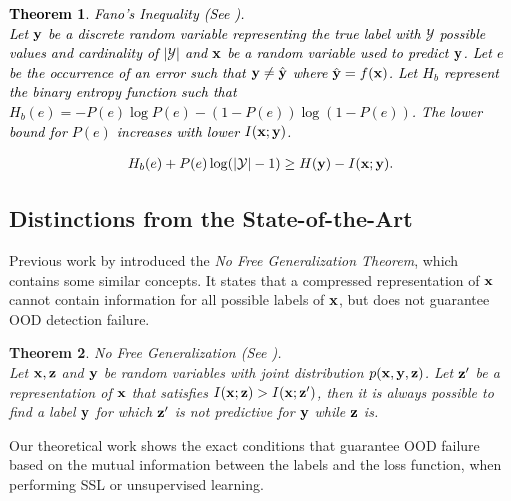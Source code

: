 \documentclass{article} %
\theoremstyle{plain}
\newtheorem{theorem}{Theorem}[section]
\theoremstyle{definition}
\theoremstyle{remark}
\begin{document}
\textcolor{black}{
\begin{theorem}
Fano's Inequality (See \citep{robert1952fano}). \\Let ${\mathbf{y}}$ be a discrete random variable representing the true label with $\mathcal{Y} $ possible values and cardinality of $|\mathcal{Y}| $ and ${\mathbf{x}}$ be a random variable used to predict ${\mathbf{y}}$. Let $e$ be the occurrence of an error such that ${\mathbf{y}} \neq \hat{ {\mathbf{y}}}$ where $\hat{ {\mathbf{y}}} = f({\mathbf{x}})$. Let $H_b$ represent the binary entropy function such that $H_b(e)=-P(e) \log P(e)-(1-P(e)) \log (1-P(e))$. The lower bound for $P(e)$ increases with lower $I({\mathbf{x}};{\mathbf{y}})$. 
\label{fano}
\end{theorem}}

\vspace{-4mm}
\textcolor{black}{
\begin{align}
H_b(e) + P(e) \log(| \mathcal{Y} |-1) \geq H({\mathbf{y}}) - I({\mathbf{x}}; {\mathbf{y}}).
\end{align}}

\vspace{-4mm}
\vspace{-2mm}\subsection{Distinctions from the State-of-the-Art}\vspace{-2mm}

Previous work by \citep{federici2020learning} introduced the \emph{No Free Generalization Theorem}, which contains some similar concepts. It states that a compressed representation of ${\mathbf{x}}$ cannot contain information for all possible labels of ${\mathbf{x}}$, but does not guarantee OOD detection failure. 

\begin{theorem}
No Free Generalization (See \citep{federici2020learning}). \\
Let ${\mathbf{x}}, {\mathbf{z}}$ and ${\mathbf{y}}$ be random variables with joint distribution $p({\mathbf{x}}, {\mathbf{y}}, {\mathbf{z}})$. Let ${\mathbf{z}}'$ be a representation of ${\mathbf{x}}$ that satisfies $I({\mathbf{x}} ; {\mathbf{z}})>I({\mathbf{x}} ; {\mathbf{z}}')$, then it is always possible to find a label ${\mathbf{y}}$ for which ${\mathbf{z}}'$ is not predictive for ${\mathbf{y}}$ while ${\mathbf{z}}$ is.

\label{nofreegen}

\end{theorem}

Our theoretical work shows the exact conditions that guarantee OOD failure based on the mutual information between the labels and the loss function, when performing SSL or unsupervised learning.
\end{document}
